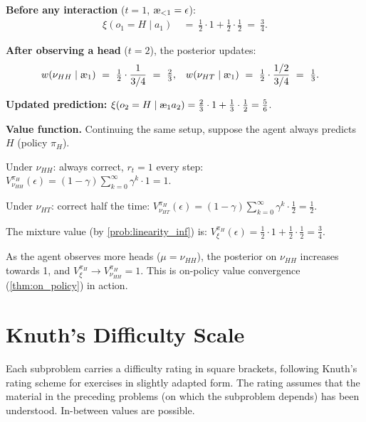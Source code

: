\documentclass[fontsize=11pt, parskip=half]{scrartcl}
\newcommand{\aes}{\textnormal{\ae}}
\begin{document}
\textbf{Before any interaction} ($t=1$, $\aes_{<1} = \epsilon$):
\begin{align*}
    \xi(o_1 = H \mid a_1) ~&=~ \tfrac{1}{2} \cdot 1 + \tfrac{1}{2} \cdot \tfrac{1}{2} ~=~ \tfrac{3}{4}.
\end{align*}

\textbf{After observing a head} ($t=2$), the posterior updates:
\begin{align*}
    w(\nu_{HH} \mid \aes_{1}) ~&=~ \tfrac{1}{2} \cdot \frac{1}{3/4} ~=~ \tfrac{2}{3}, &
    w(\nu_{HT} \mid \aes_{1}) ~&=~ \tfrac{1}{2} \cdot \frac{1/2}{3/4} ~=~ \tfrac{1}{3}.
\end{align*}

\textbf{Updated prediction:}
$\xi(o_2 = H \mid \aes_{1} a_2) = \tfrac{2}{3} \cdot 1 + \tfrac{1}{3} \cdot \tfrac{1}{2} = \tfrac{5}{6}$.

\medskip
\textbf{Value function.} Continuing the same setup, suppose the agent always predicts $H$ (policy $\pi_H$).

Under $\nu_{HH}$: always correct, $r_t = 1$ every step:
$V_{\nu_{HH}}^{\pi_H}(\epsilon) = (1-\gamma) \sum_{k=0}^\infty \gamma^k \cdot 1 = 1$.

Under $\nu_{HT}$: correct half the time:
$V_{\nu_{HT}}^{\pi_H}(\epsilon) = (1-\gamma) \sum_{k=0}^\infty \gamma^k \cdot \tfrac{1}{2} = \tfrac{1}{2}$.

The mixture value (by \cref{prob:linearity_inf}) is:
$V_\xi^{\pi_H}(\epsilon) = \tfrac{1}{2} \cdot 1 + \tfrac{1}{2} \cdot \tfrac{1}{2} = \tfrac{3}{4}$.

As the agent observes more heads ($\mu = \nu_{HH}$), the posterior on $\nu_{HH}$ increases towards 1, and $V_\xi^{\pi_H} \to V_{\nu_{HH}}^{\pi_H} = 1$. This is on-policy value convergence (\cref{thm:on_policy}) in action.


\section{Knuth's Difficulty Scale}\label{sec:appendix_difficulty}

Each subproblem carries a difficulty rating in square brackets, following Knuth's rating scheme for exercises \cite{Knuth:73a} in slightly adapted form. The rating assumes that the material in the preceding problems (on which the subproblem depends) has been understood. In-between values are possible.
\end{document}
